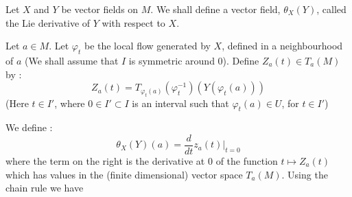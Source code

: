 Let $X$ and $Y$ be vector fields on $M$. We shall define a vector field, $\theta_{X}(Y)$, called the Lie derivative of $Y$ with respect to $X$.

Let $a\in M$. Let $\varphi_{t}$ be the local flow generated by $X$, defined in a neighbourhood of $a$ (We shall assume that $I$ is symmetric around $0$). Define $Z_{a}(t)\in T_{a}(M)$ by :
$$
Z_{a}(t)=T_{\varphi_{t}(a)}(\varphi^{-1}_{t})(Y(\varphi_{t}(a)))
$$
(Here $t\in I'$, where $0\in I'\subset I$ is an interval such that $\varphi_{t}(a)\in U$, for $t\in I'$)

We define :
$$
\theta_{X}(Y)(a)=\dfrac{d}{dt}z_{a}(t)\big|_{t=0}
$$
where the term on the right is the derivative at $0$ of the function $t\mapsto Z_{a}(t)$\pageoriginale which has values in the (finite dimensional) vector space $T_{a}(M)$. Using the chain rule we have

\begin{lemma}\label{chap6-lem6.4}

\end{lemma}







